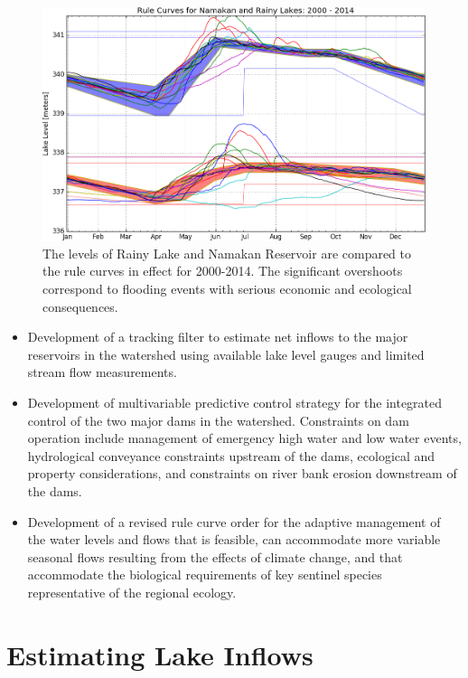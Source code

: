 \documentclass[preprint,times]{elsarticle}
\begin{document}
\begin{figure}
\includegraphics[width=\linewidth]{RuleCurvePerformance2000-2014}
\caption{The levels of Rainy Lake and Namakan Reservoir are compared to the rule curves in effect for 2000-2014. The significant overshoots correspond to flooding events with serious economic and ecological consequences.}\label{figure:4}
\end{figure}

\begin{itemize}
\item Development of a tracking filter to estimate net inflows to the major reservoirs in the watershed using available lake level gauges and limited stream flow measurements.
\item Development of multivariable predictive control strategy for the integrated control of the two major dams in the watershed.  Constraints on dam operation include management of emergency high water and low water events, hydrological conveyance constraints upstream of the dams, ecological and property considerations, and constraints on river bank erosion downstream of the dams.
\item Development of a revised rule curve order for the adaptive management of the water levels and flows that is feasible, can accommodate more variable seasonal flows resulting from the effects of climate change, and that accommodate the biological requirements of key sentinel species representative of the regional ecology.	
\end{itemize}

\section{Estimating Lake Inflows}
\end{document}
